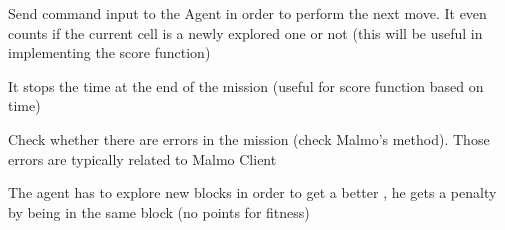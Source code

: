 \documentclass[letterpaper,10pt,english]{sphinxmanual}
\begin{document}
\begin{fulllineitems}
\begin{fulllineitems}
\end{fulllineitems}


\begin{fulllineitems}
\label{\detokenize{index:mission.mission.send_command}}
Send command input to the Agent in order to perform the next move.
It even counts if the current cell is a newly explored one or not (this
will be useful in implementing the score function)

\end{fulllineitems}


\begin{fulllineitems}
\label{\detokenize{index:mission.mission.stop_clock}}
It stops the time at the end of the mission (useful for score function based on time)

\end{fulllineitems}


\begin{fulllineitems}
\label{\detokenize{index:mission.mission.check_errors}}
Check whether there are errors in the mission (check  Malmo’s method). Those errors are typically related to Malmo Client

\end{fulllineitems}


\begin{fulllineitems}
\label{\detokenize{index:mission.mission.block_score}}
The agent has to explore new blocks in order to get a better , he gets a penalty by being in the same
block (no points for fitness)

\end{fulllineitems}


\end{fulllineitems}
\end{document}
